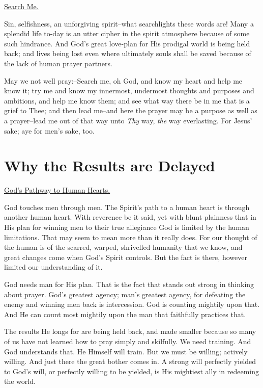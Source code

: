 \underline{Search Me.}


Sin, selfishness, an unforgiving spirit--what searchlights these words
are! Many a splendid life to-day is an utter cipher in the spirit
atmosphere because of some such hindrance. And God's great love-plan for
His prodigal world is being held back; and lives being lost even where
ultimately souls shall be saved because of the lack of human prayer
partners.

May we not well pray:--Search me, oh God, and know my heart and help me
know it; try me and know my innermost, undermost thoughts and purposes and
ambitions, and help me know them; and see what way there be in me that is
a grief to Thee; and then lead me--and here the prayer may be a purpose as
well as a prayer--lead me out of that way unto \textit{Thy} way, \textit{the} way
everlasting. For Jesus' sake; aye for men's sake, too.




\chapter{Why the Results are Delayed}



\underline{God's Pathway to Human Hearts.}


God touches men through men. The Spirit's path to a human heart is through
another human heart. With reverence be it said, yet with blunt plainness
that in His plan for winning men to their true allegiance God is limited
by the human limitations. That may seem to mean more than it really does.
For our thought of the human is of the scarred, warped, shrivelled
humanity that we know, and great changes come when God's Spirit controls.
But the fact is there, however limited our understanding of it.

God needs man for His plan. That is the fact that stands out strong in
thinking about prayer. God's greatest agency; man's greatest agency, for
defeating the enemy and winning men back is intercession. God is counting
mightily upon that. And He can count most mightily upon the man that
faithfully practices that.

The results He longs for are being held back, and made smaller because so
many of us have not learned how to pray simply and skilfully. We need
training. And God understands that. He Himself will train. But we must be
willing; actively willing. And just there the great bother comes in. A
strong will perfectly yielded to God's will, or perfectly willing to be
yielded, is His mightiest ally in redeeming the world.

